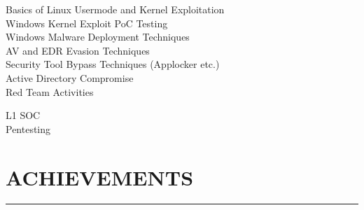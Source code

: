 \documentclass[]{resume}
\begin{document}
\begin{minipage}[t]{0.66\textwidth}
     
    \noindent

    \vspace{-8pt}
    \hspace{5em}
    \begin{minipage}{0.85\textwidth\vspace{2pt}}
        Basics of Linux Usermode and Kernel Exploitation\\
        Windows Kernel Exploit PoC Testing\\
        Windows Malware Deployment Techniques\\
        AV and EDR Evasion Techniques\\
        Security Tool Bypass Techniques (Applocker etc.)\\
        Active Directory Compromise\\
        Red Team Activities
    \end{minipage}

    \vspace{8pt}
     
    \noindent

    \vspace{-8pt}
    \hspace{5em}
    \begin{minipage}{0.85\textwidth\vspace{2pt}}
        L1 SOC\\
        Pentesting
    \end{minipage}


    \vspace{8pt}
     
    \noindent

    \vspace{4pt}
     
    \noindent


    \section{ACHIEVEMENTS}
    \noindent\rule{12.80cm}{0.4pt}


\end{minipage}
\end{document}
